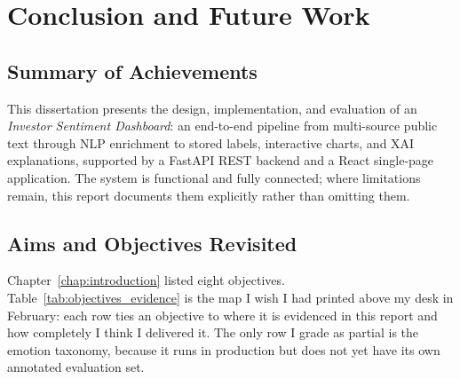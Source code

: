 \chapter{Conclusion and Future Work}
\label{chap:conclusion}

\section{Summary of Achievements}

This dissertation presents the design, implementation, and evaluation of an \textit{Investor Sentiment Dashboard}: an end-to-end pipeline from multi-source public text through NLP enrichment to stored labels, interactive charts, and XAI explanations, supported by a FastAPI REST backend and a React single-page application. The system is functional and fully connected; where limitations remain, this report documents them explicitly rather than omitting them.

\section{Aims and Objectives Revisited}
\label{sec:objectives_table}

Chapter~\ref{chap:introduction} listed eight objectives. Table~\ref{tab:objectives_evidence} is the map I wish I had printed above my desk in February: each row ties an objective to where it is evidenced in this report and how completely I think I delivered it. The only row I grade as partial is the emotion taxonomy, because it runs in production but does not yet have its own annotated evaluation set.

